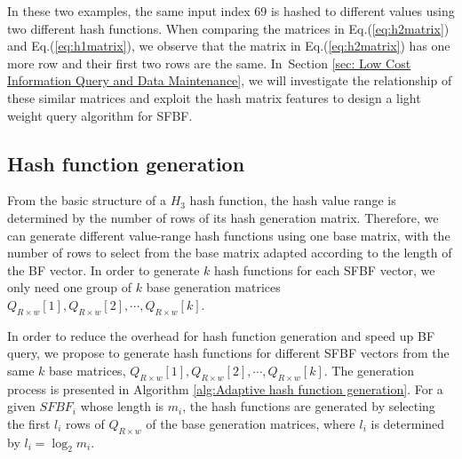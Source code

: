 \documentclass[10pt,journal,letterpaper]{IEEEtran}
\begin{document}
In these two examples, the same input index 69 is hashed to different values using two different hash functions. When comparing the matrices in Eq.(\ref{eq:h2matrix}) and Eq.(\ref{eq:h1matrix}), we observe that the matrix in Eq.(\ref{eq:h2matrix}) has one more row and their first two rows are the same. In~Section \ref{sec: Low Cost Information Query and Data Maintenance}, we will investigate the relationship of these
similar matrices and exploit the hash matrix features to design a light weight query algorithm for SFBF.

\subsection{Hash function generation}
From the basic structure of a $H_3$ hash function, the hash value range is determined by the number of rows of its hash generation matrix. Therefore, we can generate different value-range hash functions using one base matrix, with the number of rows to select from the base matrix adapted according to the length of the BF vector.  In order to generate $k$ hash functions for each SFBF vector, we only need one group of  $k$ base generation matrices ${Q_{R \times w}}[1],{Q_{R \times w}}[2], \cdots ,{Q_{R \times w}}[k]$.

In order to reduce the overhead for hash function generation and speed up BF query, we propose to generate hash functions for different SFBF vectors from the same $k$ base matrices, ${Q_{R \times w}}[1],{Q_{R \times w}}[2], \cdots ,{Q_{R \times w}}[k]$. The generation process is presented in Algorithm \ref{alg:Adaptive hash function generation}. For a given $SFBF_i$ whose length is $m_i$, the hash functions are generated by selecting the first $l_i$ rows of ${Q_{R \times w}}$ of the base generation matrices, where $l_i$ is determined by $l_i = {\log _2}{m_i}$.
\end{document}
